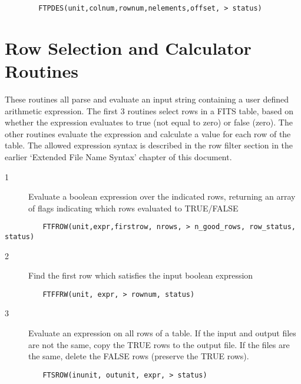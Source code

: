 \documentclass[11pt]{book}
\begin{document}
\begin{verbatim}
        FTPDES(unit,colnum,rownum,nelements,offset, > status)
\end{verbatim}


\section{Row Selection and Calculator Routines \label{FTFROW}}

These routines all parse and evaluate an input string containing a user
defined arithmetic expression.  The first 3 routines select rows in a
FITS table, based on whether the expression evaluates to true (not
equal to zero) or false (zero).  The other routines evaluate the
expression and calculate a value for each row of the table.  The
allowed expression syntax is described in the row filter section in the
earlier `Extended File Name Syntax' chapter of this document.


\begin{description}
\item[1 ] Evaluate a boolean expression over the indicated rows, returning an
 array of flags indicating which rows evaluated to TRUE/FALSE
\end{description}

\begin{verbatim}
         FTFROW(unit,expr,firstrow, nrows, > n_good_rows, row_status, status)
\end{verbatim}

\begin{description}
\item[2 ] Find the first row which satisfies the input boolean expression
\end{description}

\begin{verbatim}
         FTFFRW(unit, expr, > rownum, status)
\end{verbatim}

\begin{description}
\item[3 ]Evaluate an expression on all rows of a table.  If the input and output
files are not the same, copy the TRUE rows to the output file.  If the
files are the same, delete the FALSE rows (preserve the TRUE rows).
\end{description}

\begin{verbatim}
         FTSROW(inunit, outunit, expr, > status)
\end{verbatim}
\end{document}
